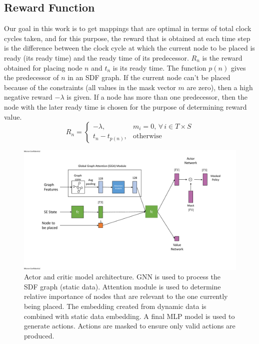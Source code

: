 \subsection{Reward Function}
Our goal in this work is to get mappings that are optimal in terms of total clock cycles taken, and for this purpose, the reward that is obtained at each time step is the difference between the clock cycle at which the current node to be placed is ready (its ready time) and the ready time of its predecessor. 
$R_n$ is the reward obtained for placing node $n$ and $t_n$ is its ready time. 
The function $p(n)$ gives the predecessor of $n$ in an SDF graph. 
If the current node can't be placed because of the constraints (all values in the mask vector $m$ are zero), then a high negative reward $-\lambda$ is given. If a node has more than one predecessor, then the node with the later ready time is chosen for the purpose of determining reward value.
\[
  R_n =
  \begin{cases}
    -\lambda,& m_i = 0, \, \forall \, i \in T \times S \\
    t_n - t_{p(n)}, & \text{otherwise}
    
  \end{cases}
\]

\begin{figure}[tb]
  \centering
  \includegraphics[width=\textwidth]{fig/model_diagram.pdf}
  \caption{Actor and critic model architecture. 
  GNN is used to process the SDF graph (static data). 
  Attention module is used to determine relative importance of nodes that are relevant to the one currently being placed. 
  The embedding created from dynamic data is combined with static data embedding. 
  A final MLP model is used to generate actions. 
  Actions are masked to ensure only valid actions are produced. }
  \label{fig:model}
\end{figure}

